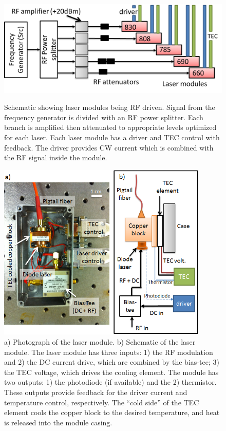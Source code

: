 \begin{figure}[p]
\centering
\includegraphics[width=12cm]{./figures/4_Gen3/RFlaser.png}
\caption[Schematic showing laser modules being RF driven]{Schematic showing laser modules being RF driven. Signal from the frequency generator is divided with an RF power splitter. Each branch is amplified then attenuated to appropriate levels optimized for each laser. Each laser module has a driver and TEC control with feedback. The driver provides CW current which is combined with the RF signal inside the module.}
\label{fig:RFlaser}
\vspace{10mm}
\includegraphics[width=10cm]{./figures/4_Gen3/laserpic.png}
\caption[Photograph and schematic of laser module]{a) Photograph of the laser module. b) Schematic of the laser module. The laser module has three inputs: 1) the RF modulation and 2) the DC current drive, which are combined by the bias-tee; 3) the TEC voltage, which drives the cooling element. The module has two outputs: 1) the photodiode (if available) and the 2) thermistor. These outputs provide feedback for the driver current and temperature control, respectively. The “cold side” of the TEC element cools the copper block to the desired temperature, and heat is released into the module casing.}
\label{fig:laserpic}
\end{figure}

